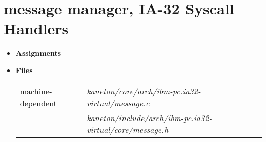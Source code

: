 \newpage

\section{message manager, \textbf{IA-32 Syscall Handlers}}
\begin{itemize}
  \item {\bf Assignments}\\

  \item {\bf {Files}}\\

    \begin{tabular}{| l | l |}
      \hline
      machine-dependent & {\em kaneton/core/arch/ibm-pc.ia32-virtual/message.c}\\
      & {\em kaneton/include/arch/ibm-pc.ia32-virtual/core/message.h}\\\hline
    \end{tabular}

\end{itemize}

